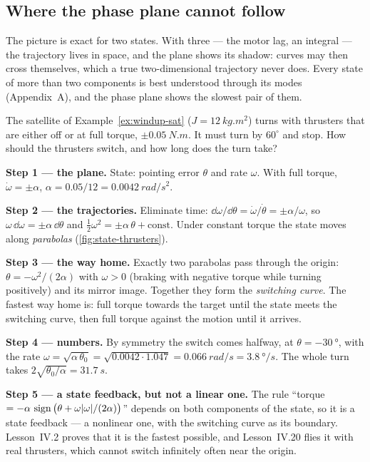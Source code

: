 \subsection{Where the phase plane cannot follow}
The picture is exact for two states. With three — the motor lag, an integral — the trajectory lives in space, and the plane shows its shadow: curves may then cross themselves, which a true two-dimensional trajectory never does. Every state of more than two components is best understood through its modes (Appendix~A), and the phase plane shows the slowest pair of them.

\begin{example}
\label{ex:state-thrusters}
The satellite of Example~\ref{ex:windup-sat} ($J = \SI{12}{kg.m^2}$) turns with thrusters that are either off or at full torque, $\pm\SI{0.05}{N.m}$. It must turn by $60^\circ$ and stop. How should the thrusters switch, and how long does the turn take?

\textbf{Step 1 — the plane.} State: pointing error $\theta$ and rate $\omega$. With full torque, $\dot\omega = \pm\alpha$, $\alpha = 0.05/12 = \SI{0.0042}{rad/s^2}$.

\textbf{Step 2 — the trajectories.} Eliminate time: $\dd\omega/\dd\theta = \dot\omega/\dot\theta = \pm\alpha/\omega$, so $\omega\,\dd\omega = \pm\alpha\,\dd\theta$ and $\tfrac12\omega^2 = \pm\alpha\,\theta + \text{const}$. Under constant torque the state moves along \emph{parabolas} (\cref{fig:state-thrusters}).

\textbf{Step 3 — the way home.} Exactly two parabolas pass through the origin: $\theta = -\omega^2/(2\alpha)$ with $\omega > 0$ (braking with negative torque while turning positively) and its mirror image. Together they form the \emph{switching curve}. The fastest way home is: full torque towards the target until the state meets the switching curve, then full torque against the motion until it arrives.

\textbf{Step 4 — numbers.} By symmetry the switch comes halfway, at $\theta = \SI{-30}{\degree}$, with the rate $\omega = \sqrt{\alpha\,\theta_0} = \sqrt{0.0042 \cdot 1.047} = \SI{0.066}{rad/s} = \SI{3.8}{\degree/s}$. The whole turn takes $2\sqrt{\theta_0/\alpha} = \SI{31.7}{s}$.

\textbf{Step 5 — a state feedback, but not a linear one.} The rule \enquote{torque $= -\alpha\,\operatorname{sign}\big(\theta + \omega|\omega|/(2\alpha)\big)$} depends on both components of the state, so it is a state feedback — a nonlinear one, with the switching curve as its boundary. Lesson~IV.2 proves that it is the fastest possible, and Lesson~IV.20 flies it with real thrusters, which cannot switch infinitely often near the origin.
\end{example}

